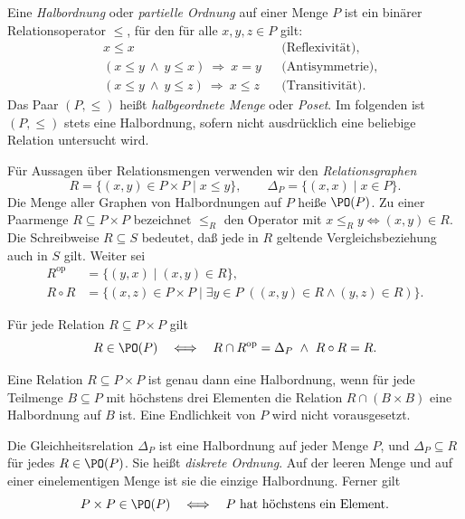 \begin{definition}[Halbordnung]\label{b12guide:def:order}
Eine \emph{Halbordnung} oder \emph{partielle Ordnung} auf einer
Menge $P$ ist ein binärer Relationsoperator $\leq$, für den
für alle $x,y,z\in P$ gilt:
\[
\begin{aligned}
 &x\leq x &&\text{(Reflexivität)},\\
 &(x\leq y\ \land\ y\leq x)\ \Rightarrow\ x=y
     &&\text{(Antisymmetrie)},\\
 &(x\leq y\ \land\ y\leq z)\ \Rightarrow\ x\leq z
     &&\text{(Transitivität)}.
\end{aligned}
\]
Das Paar $(P,\leq)$ heißt \emph{halbgeordnete Menge} oder
\emph{Poset}. Im folgenden ist $(P,\leq)$ stets eine
Halbordnung, sofern nicht ausdrücklich eine beliebige Relation
untersucht wird.
\end{definition}

Für Aussagen über Relationsmengen verwenden wir den
\emph{Relationsgraphen}
\[
 R=\{(x,y)\in P\times P\mid x\leq y\},\qquad
 \Delta_P=\{(x,x)\mid x\in P\}.
\]
Die Menge aller Graphen von Halbordnungen auf $P$ heiße
$\PO(P)$. Zu einer Paarmenge $R\subseteq P\times P$
bezeichnet $\leq_R$ den Operator mit
$x\leq_R y\Longleftrightarrow(x,y)\in R$.
Die Schreibweise $R\subseteq S$ bedeutet, daß jede in $R$
geltende Vergleichsbeziehung auch in $S$ gilt.
Weiter sei
\[
\begin{aligned}
 R^{\mathrm{op}}&=\{(y,x)\mid(x,y)\in R\},\\
 R\circ R&=\{(x,z)\in P\times P\mid
       \exists y\in P\;((x,y)\in R\land(y,z)\in R)\}.
\end{aligned}
\]

\begin{theorem}
\label{b12guide:thm:relation-criterion}
Für jede Relation $R\subseteq P\times P$ gilt
\[
 R\in\PO(P)\quad\Longleftrightarrow\quad
 R\cap R^{\mathrm{op}}=\Delta_P\ \land\ R\circ R=R.
\]
\end{theorem}

\begin{theorem}
\label{b12guide:thm:local}
Eine Relation $R\subseteq P\times P$ ist genau dann eine
Halbordnung, wenn für jede Teilmenge $B\subseteq P$ mit
höchstens drei Elementen die Relation
$R\cap(B\times B)$ eine Halbordnung auf $B$ ist.
Eine Endlichkeit von $P$ wird nicht vorausgesetzt.
\end{theorem}

\begin{theorem}
\label{b12guide:thm:discrete}
Die Gleichheitsrelation $\Delta_P$ ist eine Halbordnung auf jeder
Menge $P$, und $\Delta_P\subseteq R$ für jedes $R\in\PO(P)$.
Sie heißt \emph{diskrete Ordnung}.
Auf der leeren Menge und auf einer einelementigen Menge ist
sie die einzige Halbordnung. Ferner gilt
\[
 P\times P\in\PO(P)\quad\Longleftrightarrow\quad
 P\text{ hat höchstens ein Element}.
\]
\end{theorem}

